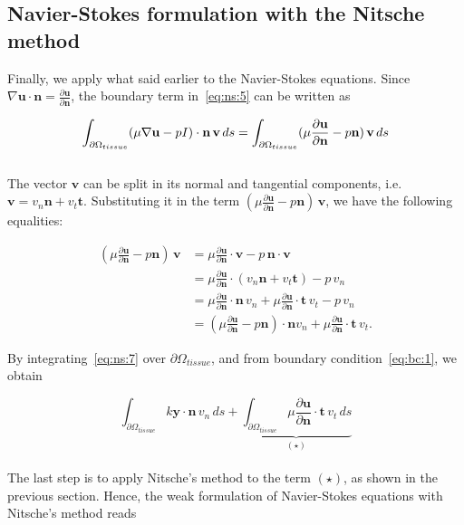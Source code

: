 \documentclass[11pt,a4paper,titlepage]{report}
\begin{document}
\subsection{Navier-Stokes formulation with the Nitsche method}
Finally, we apply what said earlier to the Navier-Stokes equations. Since $\nabla \mathbf{u} \cdot \mathbf{n} = \frac{\partial \mathbf{u}}{\partial \mathbf{n}}$, the boundary term in~\eqref{eq:ns:5} can be written as

\begin{equation}
\label{eq:ns:6}
\int_{\partial \Omega_{tissue}} (\mu \nabla \mathbf{u} -  pI) \cdot \mathbf{n} \, \mathbf{v} \, ds
= \int_{\partial \Omega_{tissue}} (\mu \frac{\partial \mathbf{u}}{\partial \mathbf{n}} -  p \mathbf{n}) \, \mathbf{v} \, ds \\ 
\end{equation}
\\
The vector $\mathbf{v}$ can be split in its normal and tangential components, i.e. $\mathbf{v} = v_n \mathbf{n} + v_t \mathbf{t}$. Substituting it in the term $(\mu \frac{\partial \mathbf{u}}{\partial \mathbf{n}} -  p \mathbf{n}) \, \mathbf{v}$, we have the following equalities:

\begin{align}
(\mu \frac{\partial \mathbf{u}}{\partial \mathbf{n}} -  p \mathbf{n}) \, \mathbf{v}
& = \mu \frac{\partial \mathbf{u}}{\partial \mathbf{n}} \cdot \mathbf{v} - p \, \mathbf{n} \cdot \mathbf{v} \\
& = \mu \frac{\partial \mathbf{u}}{\partial \mathbf{n}} \cdot (v_n \mathbf{n} + v_t \mathbf{t}) - p \, v_n \\
& = \mu \frac{\partial \mathbf{u}}{\partial \mathbf{n}} \cdot \mathbf{n} \, v_n + \mu \frac{\partial \mathbf{u}}{\partial \mathbf{n}} \cdot \mathbf{t} \, v_t   - p \, v_n \\
\label{eq:ns:7}
& = (\mu \frac{\partial \mathbf{u}}{\partial \mathbf{n}} - p\mathbf{n}) \cdot \mathbf{n} v_n + \mu \frac{\partial \mathbf{u}}{\partial \mathbf{n}} \cdot \mathbf{t} \, v_t. 
\end{align}

By integrating~\eqref{eq:ns:7} over $\partial \Omega_{tissue}$, and from boundary condition~\eqref{eq:bc:1}, we obtain

\begin{equation}
\int_{\partial \Omega_{tissue}} k \mathbf{y} \cdot \mathbf{n} \, v_n \, ds 
+ \underbrace{ \int_{\partial \Omega_{tissue}} \mu \frac{\partial \mathbf{u}}{\partial \mathbf{n}} \cdot \mathbf{t} \, v_t \, ds }_{(\star)}
\end{equation}
\\
The last step is to apply Nitsche's method to the term $(\star)$, as shown in the previous section. Hence, the weak formulation of Navier-Stokes equations with Nitsche's method reads
\end{document}
